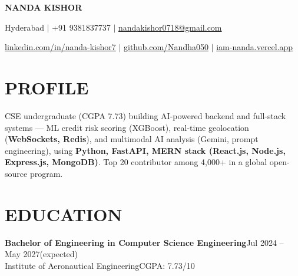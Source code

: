 \documentclass[10pt,a4paper]{article}
\newcommand{\resumeSubheading}[4]{
\textbf{#1}\hfill #2\\
#3\hfill #4
}
\begin{document}

\begin{center}

{\Huge\bfseries NANDA KISHOR}

\vspace{4pt}

\small
Hyderabad \hspace{0.5em}$|$\hspace{0.5em}
+91 9381837737 \hspace{0.5em}$|$\hspace{0.5em}
\href{mailto:nandakishor0718@gmail.com}{nandakishor0718@gmail.com}

\vspace{2pt}

\small
\href{https://www.linkedin.com/in/nanda-kishor-b3ab0833b}{linkedin.com/in/nanda-kishor7}
\hspace{0.5em}$|$\hspace{0.5em}
\href{https://github.com/Nandha050}{github.com/Nandha050}
\hspace{0.5em}$|$\hspace{0.5em}
\href{https://iam-nanda.vercel.app}{iam-nanda.vercel.app}

\end{center}



\section*{PROFILE}

CSE undergraduate (CGPA 7.73) building AI-powered backend and full-stack systems — ML credit risk scoring (XGBoost), real-time geolocation (\textbf{WebSockets, Redis}), and multimodal AI analysis (Gemini, prompt engineering), using \textbf{Python, FastAPI, MERN stack (React.js, Node.js, Express.js, MongoDB)}. Top 20 contributor among 4,000+ in a global open-source program.


\section*{EDUCATION}

\resumeSubheading
{Bachelor of Engineering in Computer Science Engineering}
{Jul 2024 -- May 2027(expected)}
{Institute of Aeronautical Engineering}
{CGPA: 7.73/10}
\end{document}
